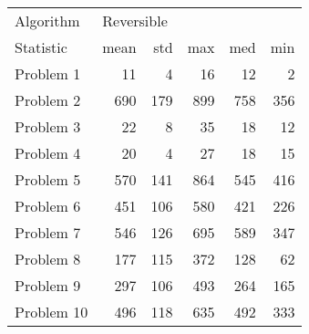 \begin{tabular}{lrrrrr}
\toprule
Algorithm & \multicolumn{5}{l}{Reversible} \\
Statistic &       mean &  std &  max &  med &  min \\
\midrule
Problem 1  &         11 &    4 &   16 &   12 &    2 \\
Problem 2  &        690 &  179 &  899 &  758 &  356 \\
Problem 3  &         22 &    8 &   35 &   18 &   12 \\
Problem 4  &         20 &    4 &   27 &   18 &   15 \\
Problem 5  &        570 &  141 &  864 &  545 &  416 \\
Problem 6  &        451 &  106 &  580 &  421 &  226 \\
Problem 7  &        546 &  126 &  695 &  589 &  347 \\
Problem 8  &        177 &  115 &  372 &  128 &   62 \\
Problem 9  &        297 &  106 &  493 &  264 &  165 \\
Problem 10 &        496 &  118 &  635 &  492 &  333 \\
\bottomrule
\end{tabular}
